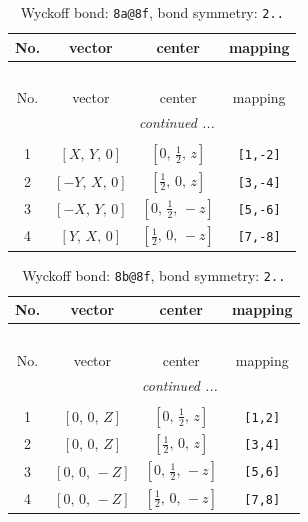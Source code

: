 \documentclass[fleqn,8pt]{jsarticle}
\begin{document}
\begin{longtable}{cccc}
\caption{Wyckoff bond: {\tt 8a@8f}, bond symmetry: {\tt 2..}}
 \\
 \hline \hline
No. & vector & center & mapping \\ \hline \endfirsthead

\multicolumn{3}{l}{\tablename\ \thetable{}} \\
 \hline \hline
No. & vector & center & mapping \\ \hline \endhead

 \hline \hline
\multicolumn{3}{r}{\footnotesize\it continued ...} \\ \endfoot

 \hline \hline
\multicolumn{3}{r}{} \\ \endlastfoot

1 & $\left[ X,\, Y,\, 0 \right]$ & $\left[ 0,\, \frac{1}{2},\, z \right]$ & {\tt [1,-2]} \\ \hline
2 & $\left[ - Y,\, X,\, 0 \right]$ & $\left[ \frac{1}{2},\, 0,\, z \right]$ & {\tt [3,-4]} \\ \hline
3 & $\left[ - X,\, Y,\, 0 \right]$ & $\left[ 0,\, \frac{1}{2},\, - z \right]$ & {\tt [5,-6]} \\ \hline
4 & $\left[ Y,\, X,\, 0 \right]$ & $\left[ \frac{1}{2},\, 0,\, - z \right]$ & {\tt [7,-8]} \\
\end{longtable}
\renewcommand{\arraystretch}{1.2}
\begin{longtable}{cccc}
\caption{Wyckoff bond: {\tt 8b@8f}, bond symmetry: {\tt 2..}}
 \\
 \hline \hline
No. & vector & center & mapping \\ \hline \endfirsthead

\multicolumn{3}{l}{\tablename\ \thetable{}} \\
 \hline \hline
No. & vector & center & mapping \\ \hline \endhead

 \hline \hline
\multicolumn{3}{r}{\footnotesize\it continued ...} \\ \endfoot

 \hline \hline
\multicolumn{3}{r}{} \\ \endlastfoot

1 & $\left[ 0,\, 0,\, Z \right]$ & $\left[ 0,\, \frac{1}{2},\, z \right]$ & {\tt [1,2]} \\ \hline
2 & $\left[ 0,\, 0,\, Z \right]$ & $\left[ \frac{1}{2},\, 0,\, z \right]$ & {\tt [3,4]} \\ \hline
3 & $\left[ 0,\, 0,\, - Z \right]$ & $\left[ 0,\, \frac{1}{2},\, - z \right]$ & {\tt [5,6]} \\ \hline
4 & $\left[ 0,\, 0,\, - Z \right]$ & $\left[ \frac{1}{2},\, 0,\, - z \right]$ & {\tt [7,8]} \\
\end{longtable}
\end{document}
